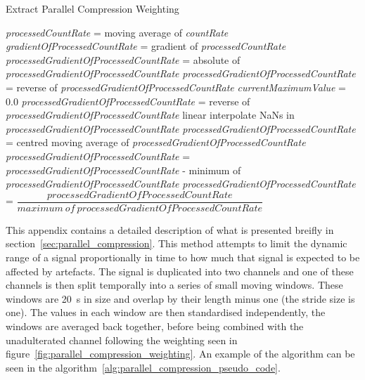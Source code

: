         \begin{algorithm} \label{alg:extract_parallel_compression_weighting_pseudo_code}
            \caption{Extract Parallel Compression Weighting}
            \;
            \textit{processedCountRate} = moving average of \textit{countRate}\;
            \;
            \textit{gradientOfProcessedCountRate} = gradient of \textit{processedCountRate}\;
            \;
            \textit{processedGradientOfProcessedCountRate} = absolute of \textit{processedGradientOfProcessedCountRate}\;
            \;
            \textit{processedGradientOfProcessedCountRate} = reverse of \textit{processedGradientOfProcessedCountRate}\;
            \textit{currentMaximumValue} = 0.0\;
            \;
            \;
            \textit{processedGradientOfProcessedCountRate} = reverse of \textit{processedGradientOfProcessedCountRate}\;
            linear interpolate \glspl{NaN} in \textit{processedGradientOfProcessedCountRate}\;
            \;
            \textit{processedGradientOfProcessedCountRate} = centred moving average of \textit{processedGradientOfProcessedCountRate}\;
            \;
            \textit{processedGradientOfProcessedCountRate} = \textit{processedGradientOfProcessedCountRate} - minimum of \textit{processedGradientOfProcessedCountRate}\;
            \textit{processedGradientOfProcessedCountRate} = $\dfrac{\textit{processedGradientOfProcessedCountRate}}{maximum\ of\ \textit{processedGradientOfProcessedCountRate}}$\;
        \end{algorithm}

        This appendix contains a detailed description of what is presented breifly in section~\ref{sec:parallel_compression}. This method attempts to limit the dynamic range of a signal proportionally in time to how much that signal is expected to be affected by artefacts. The signal is duplicated into two channels and one of these channels is then split temporally into a series of small moving windows. These windows are \SI{20}{\second} in size and overlap by their length minus one (the stride size is one). The values in each window are then standardised independently, the windows are averaged back together, before being combined with the unadulterated channel following the weighting seen in figure~\ref{fig:parallel_compression_weighting}. An example of the algorithm can be seen in the algorithm~\ref{alg:parallel_compression_pseudo_code}.
        
